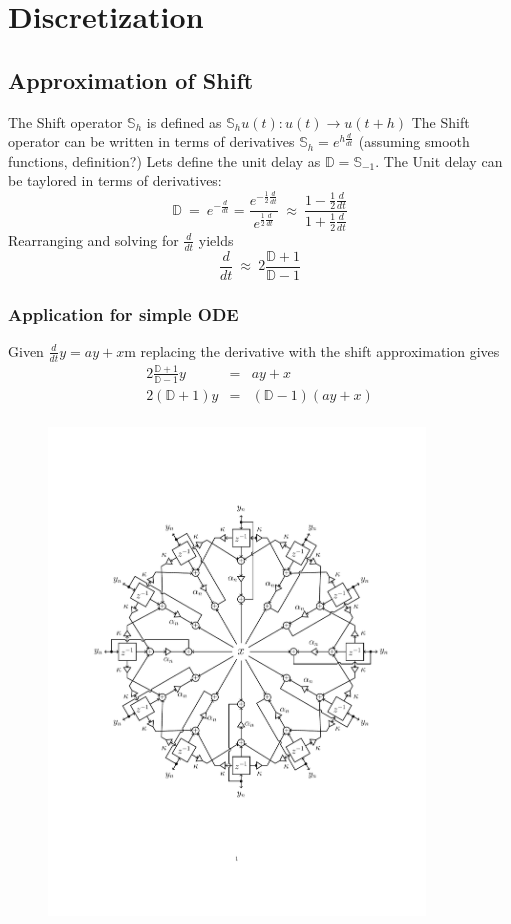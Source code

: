 \documentclass[11pt,twocolumn]{article}
\newcommand{\be}{\begin{equation}}
\newcommand{\ee}{\end{equation}}
\newcommand{\bea}{\begin{eqnarray*}}
\newcommand{\eea}{\end{eqnarray*}}
\begin{document}
\section{Discretization}


\subsection{Approximation of Shift}


The Shift operator $\mathbb{S}_h$ is defined as $\mathbb{S}_h u(t): u(t) \rightarrow u(t+h)$
The Shift operator can be written in terms of derivatives $\mathbb{S}_h = e^{h\frac{d}{dt}}$ (assuming smooth functions, definition?)
Lets define the unit delay as $\mathbb{D} = \mathbb{S}_{-1}$.
The Unit delay can be taylored in terms of derivatives:
\be
   \mathbb{D} \ = \ e^{-\frac{d}{dt} } = \frac{ e^{-\frac{1}{2}\frac{d}{dt} } }{ e^{\frac{1}{2}\frac{d}{dt} } }
              \ \approx \ \frac{ 1 - \frac{1}{2}\frac{d}{dt} }{ 1 + \frac{1}{2}\frac{d}{dt} }
\ee
Rearranging and solving for $\frac{d}{dt}$ yields
\be
   \frac{d}{dt} \ \approx \ 2 \frac{ \mathbb{D} + 1 }{ \mathbb{D} - 1 }
\ee



\subsubsection{Application for simple ODE}

Given $\frac{d}{dt}y = ay + x$m replacing the derivative with the shift approximation gives
\bea
    2 \tfrac{ \mathbb{D} + 1 }{ \mathbb{D} - 1 } y  &=& ay + x \\
    2 (\mathbb{D} + 1 ) y  &=& ( \mathbb{D} - 1 )(ay + x) \\
\eea


\begin{figure}
\includegraphics[width=10cm]{gabor_bank_2.pdf}
\end{figure}
\end{document}
